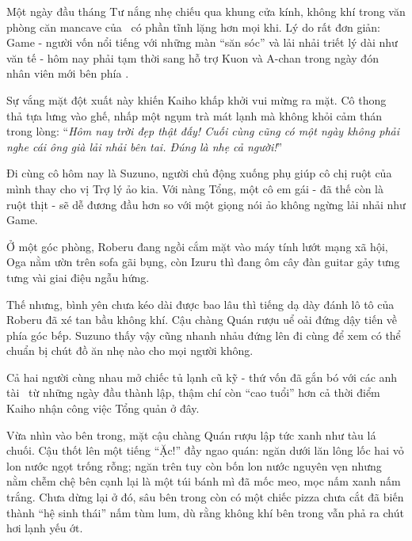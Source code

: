 \documentclass[../main.tex]{subfiles}
\begin{document}

Một ngày đầu tháng Tư nắng nhẹ chiếu qua khung cửa kính, không khí trong văn phòng căn mancave của \hls\ có phần tĩnh lặng hơn mọi khi. Lý do rất đơn giản: Game - người vốn nổi tiếng với những màn ``săn sóc'' và lải nhải triết lý dài như văn tế - hôm nay phải tạm thời sang hỗ trợ Kuon và A-chan trong ngày đón nhân viên mới bên phía \hll.

Sự vắng mặt đột xuất này khiến Kaiho khấp khởi vui mừng ra mặt. Cô thong thả tựa lưng vào ghế, nhấp một ngụm trà mát lạnh mà không khỏi cảm thán trong lòng: ``\textit{Hôm nay trời đẹp thật đấy! Cuối cùng cũng có một ngày không phải nghe cái ông già lải nhải bên tai. Đúng là nhẹ cả người!}''

Đi cùng cô hôm nay là Suzuno, người chủ động xuống phụ giúp cô chị ruột của mình thay cho vị Trợ lý ảo kia. Với nàng Tổng, một cô em gái - đã thế còn là ruột thịt - sẽ dễ đương đầu hơn so với một giọng nói ảo không ngừng lải nhải như Game.

Ở một góc phòng, Roberu đang ngồi cắm mặt vào máy tính lướt mạng xã hội, Oga nằm ườn trên sofa gãi bụng, còn Izuru thì đang ôm cây đàn guitar gảy tưng tưng vài giai điệu ngẫu hứng.

Thế nhưng, bình yên chưa kéo dài được bao lâu thì tiếng dạ dày đánh lô tô của Roberu đã xé tan bầu không khí. Cậu chàng Quán rượu uể oải đứng dậy tiến về phía góc bếp. Suzuno thấy vậy cũng nhanh nhảu đứng lên đi cùng để xem có thể chuẩn bị chút đồ ăn nhẹ nào cho mọi người không.

Cả hai người cùng nhau mở chiếc tủ lạnh cũ kỹ - thứ vốn đã gắn bó với các anh tài \hls\ từ những ngày đầu thành lập, thậm chí còn ``cao tuổi'' hơn cả thời điểm Kaiho nhận công việc Tổng quản ở đây.

Vừa nhìn vào bên trong, mặt cậu chàng Quán rượu lập tức xanh như tàu lá chuối. Cậu thốt lên một tiếng ``Ặc!'' đầy ngao quán: ngăn dưới lăn lông lốc hai vỏ lon nước ngọt trống rỗng; ngăn trên tuy còn bốn lon nước nguyên vẹn nhưng nằm chễm chệ bên cạnh lại là một túi bánh mì đã mốc meo, mọc nấm xanh nấm trắng. Chưa dừng lại ở đó, sâu bên trong còn có một chiếc pizza chưa cắt đã biến thành ``hệ sinh thái'' nấm tùm lum, dù rằng không khí bên trong vẫn phả ra chút hơi lạnh yếu ớt.
\end{document}
